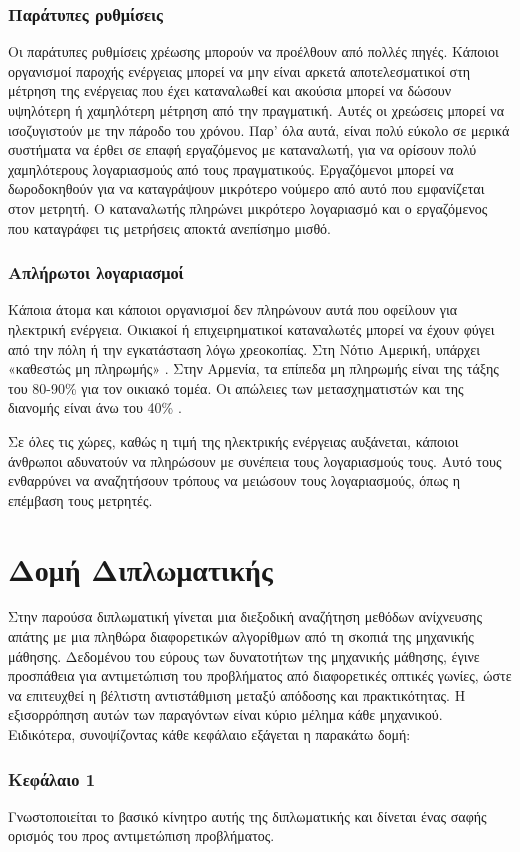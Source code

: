 \subsubsection{Παράτυπες ρυθμίσεις}
Οι παράτυπες ρυθμίσεις χρέωσης μπορούν να προέλθουν από πολλές πηγές. Κάποιοι οργανισμοί παροχής ενέργειας μπορεί να μην είναι αρκετά αποτελεσματικοί στη μέτρηση της ενέργειας που έχει καταναλωθεί και ακούσια μπορεί να δώσουν υψηλότερη ή χαμηλότερη μέτρηση από την πραγματική. Αυτές οι χρεώσεις μπορεί να ισοζυγιστούν με την πάροδο του χρόνου. Παρ' όλα αυτά, είναι πολύ εύκολο σε μερικά συστήματα να έρθει σε επαφή εργαζόμενος με καταναλωτή, για να ορίσουν  πολύ χαμηλότερους λογαριασμούς από τους πραγματικούς. Εργαζόμενοι μπορεί να δωροδοκηθούν για να καταγράψουν μικρότερο νούμερο από αυτό που εμφανίζεται στον μετρητή. Ο καταναλωτής πληρώνει μικρότερο λογαριασμό και ο εργαζόμενος που καταγράφει τις μετρήσεις αποκτά ανεπίσημο μισθό.
\subsubsection{Απλήρωτοι λογαριασμοί}
Κάποια άτομα και κάποιοι οργανισμοί δεν πληρώνουν αυτά που οφείλουν για ηλεκτρική ενέργεια. Οικιακοί ή επιχειρηματικοί καταναλωτές  μπορεί να έχουν φύγει από την πόλη ή την εγκατάσταση λόγω χρεοκοπίας. Στη Νότιο Αμερική, υπάρχει «καθεστώς μη πληρωμής» \cite{mkhwanazi}. Στην Αρμενία, τα επίπεδα μη πληρωμής είναι της τάξης του 80-90\% για τον οικιακό τομέα. Οι απώλειες των μετασχηματιστών και της διανομής είναι άνω του 40\% \cite{tacis}.\par
Σε όλες τις χώρες, καθώς η τιμή της ηλεκτρικής ενέργειας αυξάνεται, κάποιοι άνθρωποι αδυνατούν να πληρώσουν με συνέπεια τους λογαριασμούς τους. Αυτό τους ενθαρρύνει να αναζητήσουν τρόπους να μειώσουν τους λογαριασμούς, όπως η επέμβαση τους μετρητές.
\section{Δομή Διπλωματικής}
Στην παρούσα διπλωματική γίνεται μια διεξοδική αναζήτηση μεθόδων ανίχνευσης απάτης με μια πληθώρα διαφορετικών αλγορίθμων από τη σκοπιά της μηχανικής μάθησης. Δεδομένου του εύρους των δυνατοτήτων της μηχανικής μάθησης, έγινε προσπάθεια για αντιμετώπιση του προβλήματος από διαφορετικές οπτικές γωνίες, ώστε να επιτευχθεί η βέλτιστη αντιστάθμιση μεταξύ απόδοσης και πρακτικότητας. Η εξισορρόπηση αυτών των παραγόντων είναι κύριο μέλημα κάθε μηχανικού. Ειδικότερα, συνοψίζοντας κάθε κεφάλαιο εξάγεται η παρακάτω δομή:%
\subsubsection{Κεφάλαιο 1}
Γνωστοποιείται το βασικό κίνητρο αυτής της διπλωματικής και δίνεται ένας σαφής ορισμός του προς αντιμετώπιση προβλήματος.

